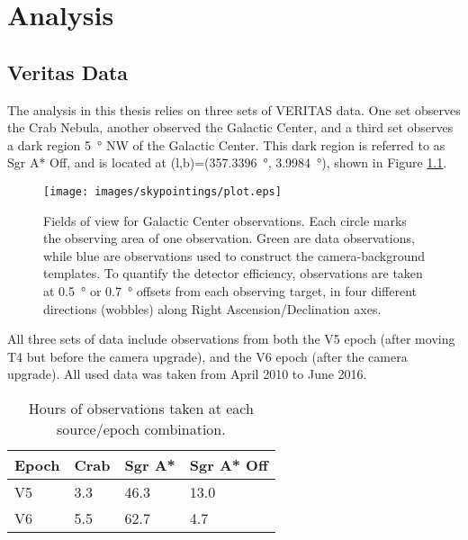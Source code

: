 \cleartooddpage[\thispagestyle{empty}]
\chapter{Analysis}

\section{Veritas Data}\label{veritasdata}
  The analysis in this thesis relies on three sets of VERITAS data.
  One set observes the Crab Nebula, another observed the Galactic Center, and a third set observes a dark region \SI{5}{\degree} NW of the Galactic Center.
  This dark region is referred to as  Sgr A* Off, and is located at (l,b)=(\SI{357.3396}{\degree}, \SI{3.9984}{\degree}), shown in Figure \ref{fig:gcfieldsofview}.

  \begin{figure}[ht]
    \centering
    \texttt{[image: images/skypointings/plot.eps]}
    \caption[VERITAS Galactic Center Pointings]{
      Fields of view for Galactic Center observations.
      Each circle marks the observing area of one observation.
      Green are data observations, while blue are observations used to construct the camera-background templates.
      To quantify the detector efficiency, observations are taken at \SI{0.5}{\degree} or \SI{0.7}{\degree} offsets from each observing target, in four different directions (wobbles) along Right Ascension/Declination axes.
    }
    \label{fig:gcfieldsofview}
  \end{figure}


  All three sets of data include observations from both the V5 epoch (after moving T4 but before the camera upgrade), and the V6 epoch (after the camera upgrade).
  All used data was taken from April 2010 to June 2016.

  \begin{table}[]
    \centering
    \caption{Hours of observations taken at each source/epoch combination.}
    \label{tab:observation_times}
    \begin{tabular}{|l|l|l|l|}
      \hline
      \textbf{Epoch} & \textbf{Crab} & \textbf{Sgr A*} & \textbf{Sgr A* Off} \\ \hline
      V5             & 3.3           & 46.3            & 13.0                \\ \hline
      V6             & 5.5           & 62.7            & 4.7                 \\ \hline
    \end{tabular}
  \end{table}


